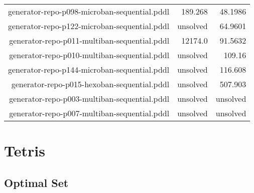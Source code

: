 \documentclass{article}
\begin{document}
\begin{center}
\begin{tabular}{r|r|r}
 generator-repo-p098-microban-sequential.pddl&189.268&48.1986\\
 generator-repo-p122-microban-sequential.pddl&unsolved&64.9601\\
 generator-repo-p011-multiban-sequential.pddl&12174.0&91.5632\\
 generator-repo-p010-multiban-sequential.pddl&unsolved&109.16\\
 generator-repo-p144-microban-sequential.pddl&unsolved&116.608\\
 generator-repo-p015-hexoban-sequential.pddl&unsolved&507.903\\
 generator-repo-p003-multiban-sequential.pddl&unsolved&unsolved\\
 generator-repo-p007-multiban-sequential.pddl&unsolved&unsolved
                            \end{tabular}
                            \end{center}
                    
                \newpage \section{Tetris}
                    \subsection*{Optimal Set}
                    
\end{document}
